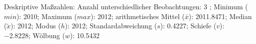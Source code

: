 				\label{tableValues:cend10_g1}
				\vspace*{-\baselineskip}
                    \begin{noten}
                	    \note{} Deskriptive Maßzahlen:
                	    Anzahl unterschiedlicher Beobachtungen: 3%
                	    ; 
                	      Minimum ($min$): 2010; 
                	      Maximum ($max$): 2012; 
                	      arithmetisches Mittel ($\bar{x}$): \num[round-mode=places,round-precision=2]{2011.8471}; 
                	      Median ($\tilde{x}$): 2012; 
                	      Modus ($h$): 2012; 
                	      Standardabweichung ($s$): \num[round-mode=places,round-precision=2]{0.4227}; 
                	      Schiefe ($v$): \num[round-mode=places,round-precision=2]{-2.8228}; 
                	      Wölbung ($w$): \num[round-mode=places,round-precision=2]{10.5432}
                     \end{noten}

